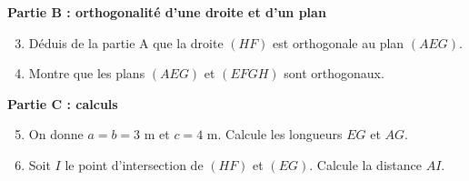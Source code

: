 \documentclass[11pt]{article}
\begin{document}
\begin{exercice}
\textbf{Partie B : orthogonalité d'une droite et d'un plan}
\begin{enumerate}
\setcounter{enumi}{2}
\item Déduis de la partie A que la droite $(HF)$ est orthogonale au plan $(AEG)$.
\item Montre que les plans $(AEG)$ et $(EFGH)$ sont orthogonaux.
\end{enumerate}

\textbf{Partie C : calculs}
\begin{enumerate}
\setcounter{enumi}{4}
\item On donne $a = b = 3$ m et $c = 4$ m. Calcule les longueurs $EG$ et $AG$.
\item Soit $I$ le point d'intersection de $(HF)$ et $(EG)$. Calcule la distance $AI$.
\end{enumerate}
\end{exercice}
\end{document}
